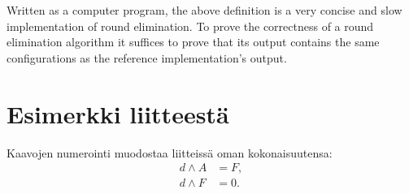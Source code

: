 \documentclass[english, 12pt, a4paper, sci, utf8, a-1b, online]{aaltothesis}
\begin{document}
Written as a computer program, the above definition is a very concise and slow implementation of round elimination. To prove the correctness of a round elimination algorithm it suffices to prove that its output contains the same configurations as the reference implementation's output.

\clearpage
\thesisbibliography{}




\clearpage
\thesisappendix{}

\section{Esimerkki liitteestä\label{LiiteA}}

Kaavojen numerointi muodostaa liitteissä oman kokonaisuutensa:
\begin{align}
d \wedge A &= F, \label{liitekaava1}\\
d \wedge F &= 0. \label{liitekaava2}
\end{align}
\end{document}
